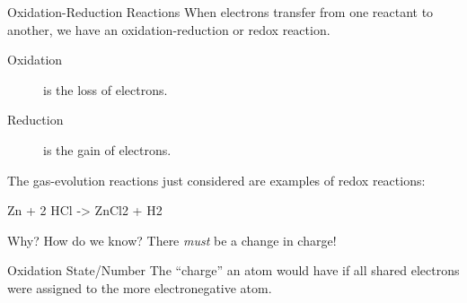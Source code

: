 \documentclass[notes=only]{beamer}
\begin{document}
\begin{frame}{Oxidation-Reduction Reactions}
	When electrons transfer from one reactant to another, we have an
	\alert{oxidation-reduction} or \alert{redox} reaction.
	\begin{description}
		\item[Oxidation] is the \alert{loss} of electrons.
		\item[Reduction] is the \alert{gain} of electrons.
	\end{description}

	\pause

	The gas-evolution reactions just considered are examples of redox
	reactions:
	\begin{reaction*}
		Zn\sld{} + 2 HCl\aq{} -> ZnCl2\aq{} + H2\gas{}
	\end{reaction*}

	\pause

	\begin{center}
		Why? How do we know?
		\pause
		There \emph{must} be a change in charge!
	\end{center}

	\begin{block}{Oxidation State/Number}
		The ``charge'' an atom would have if all shared electrons were
		assigned to the more electronegative atom.
	\end{block}
\end{frame}

\end{document}
